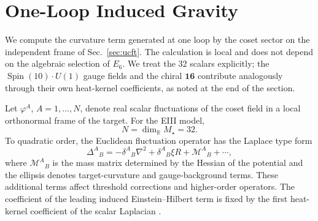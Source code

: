 \documentclass[aps,prd,preprint,longbibliography,nofootinbib,superscriptaddress,floatfix]{revtex4-2}
\newcommand{\Spin}{\operatorname{Spin}}
\begin{document}

\section{One-Loop Induced Gravity}
\label{sec:induced_gravity}

We compute the curvature term generated at one loop by the coset sector on the
independent frame of Sec.~\ref{sec:ucft}. The calculation is local and does not
depend on the algebraic selection of \(E_6\). We treat the \(32\) scalars
explicitly; the \(\Spin(10)\cdot U(1)\) gauge fields and the chiral
\(\mathbf{16}\) contribute analogously through their own heat-kernel
coefficients, as noted at the end of the section.

Let \(\varphi^A\), \(A=1,\ldots,N\), denote real scalar fluctuations of the
coset field in a local orthonormal frame of the target. For the EIII model,
\begin{equation}
    N=\dim_{\mathbb R}M_\star=32 .
    \label{eq:induced_N_32}
\end{equation}
To quadratic order, the Euclidean fluctuation operator has the Laplace type
form
\begin{equation}
    \Delta^A{}_{B}
    =
    -\delta^A{}_{B}\nabla^2
    +
    \delta^A{}_{B}\xi R
    +
    \mathcal M^A{}_{B}
    +
    \cdots ,
    \label{eq:induced_laplace_operator}
\end{equation}
where \(\mathcal M^A{}_{B}\) is the mass matrix determined by the Hessian of
the potential and the ellipsis denotes target-curvature and gauge-background
terms. These additional terms affect threshold corrections and higher-order
operators. The coefficient of the leading induced Einstein--Hilbert term is
fixed by the first heat-kernel coefficient of the scalar Laplacian
\cite{DeWittDynamicalTheory,BirrellDavies,GilkeyInvariance}.
\end{document}
